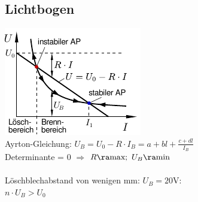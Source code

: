\documentclass[european]{latex4ei_sheet}
\begin{document}
	\subsection{Lichtbogen}
	\includegraphics{./img/Lichtbogen.pdf}\\
	Ayrton-Gleichung: $U_B = U_0 - R \cdot I_B = a + bl + \frac{c+dl}{I_B}$\\
	Determinante = 0 \quad $\Longrightarrow$ \quad $R \ra \text{max};\ U_{B} \ra \text{min}$\\
	\\
	Löschblechabstand von wenigen mm: $U_B = 20$V:\\
	$n \cdot U_B > U_0$

\end{document}
